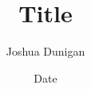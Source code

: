 \documentclass[12pt]{article}
\title{Title}
\author{Joshua Dunigan}
\date{Date}
\begin{document}
\begin{titlingpage}
    \maketitle
\end{titlingpage}
\end{document}
